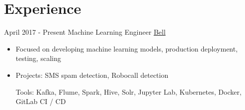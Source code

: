 \documentclass[letterpaper]{twentysecondcv} %
\begin{document}
\makeprofile %
 

\section{Experience}

\begin{twenty} %
\twentyitem
    	{April 2017 -}
		{Present}
        {Machine Learning Engineer}
        {\href{http://www.bell.ca/}{Bell}}
        {}
        {\begin{itemize}
        \item Focused on developing machine learning models, production deployment, testing, scaling
        \item Projects: SMS spam detection, Robocall detection 
        
        Tools: Kafka, Flume, Spark, Hive, Solr, Jupyter Lab, Kubernetes, Docker, GitLab CI / CD
        

\end{itemize}}
\end{twenty}
\end{document}
